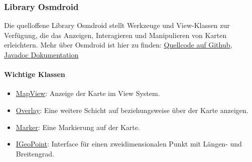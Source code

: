 \subsubsection{Library Osmdroid}
Die quelloffene Library Osmdroid stellt Werkzeuge und View-Klassen zur Verfügung, die das Anzeigen, 
Interagieren und Manipulieren von Karten erleichtern.
Mehr über Osmdroid ist hier zu finden:
\href{https://github.com/osmdroid/osmdroid}{Quellcode auf Github}, 
\href{https://osmdroid.github.io/osmdroid/javadoc.html}{Javadoc Dokumentation}
\paragraph*{Wichtige Klassen}
\begin{itemize}
    \item \href{https://osmdroid.github.io/osmdroid/javadocAll/org/osmdroid/views/MapView.html}
    {MapView}: Anzeige der Karte im View System.
    \item \href{https://osmdroid.github.io/osmdroid/javadocAll/org/osmdroid/views/overlay/Overlay.html}
    {Overlay}: Eine weitere Schicht auf beziehungsweise über der Karte anzeigen.
    \item \href{https://osmdroid.github.io/osmdroid/javadocAll/org/osmdroid/views/overlay/Marker.html}
    {Marker}: Eine Markierung auf der Karte.
    \item \href{https://osmdroid.github.io/osmdroid/javadocAll/org/osmdroid/api/IGeoPoint.html}
    {IGeoPoint}: Interface für einen zweidimensionalen Punkt mit Längen- und Breitengrad.
\end{itemize}
